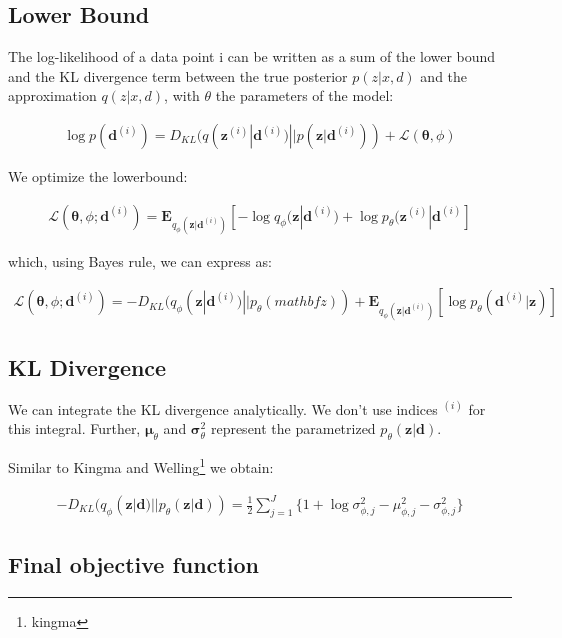 \documentclass{article}
\begin{document}
\subsection{Lower Bound}

The log-likelihood of a data point i can be written as a sum of the lower bound and the KL divergence term between the true posterior $p(z|x,d)$ and the approximation $q(z|x,d)$, with $\theta$ the parameters of the model:

\begin{align*}
	\log p(\mathbf{d}^{(i)}) = D_{KL}(q(\mathbf{z}^{(i)}|\mathbf{d}^{(i)}) || p(\mathbf{z}|\mathbf{d}^{(i)})) + \mathcal{L}(\mathbf{\theta}, \phi)
\end{align*}

We optimize the lowerbound: 

\begin{align}
\mathcal{L}(\mathbf{\theta}, \phi; \mathbf{d}^{(i)}) = 
\mathbf{E}_{q_\phi (\mathbf{z}|\mathbf{d}^{(i)})}[-\log q_\phi (\mathbf{z}| \mathbf{d}^{(i)})+\log p_\theta(\mathbf{z}^{(i)}|\mathbf{d}^{(i)} ]
\end{align}

which, using Bayes rule, we can express as:

\begin{align}
\mathcal{L}(\mathbf{\theta}, \phi; \mathbf{d}^{(i)}) = -D_{KL}(q_\phi (\mathbf{z}| \mathbf{d}^{(i)})||p_\theta (mathbf{z})) + \mathbf{E}_{q_\phi(\mathbf{z}|\mathbf{d}^{(i)})}[\log p_\theta (\mathbf{d}^{(i)}|\mathbf{z})]
\end{align}


\subsection{KL Divergence}

We can integrate the KL divergence analytically. We don't use indices $^{(i)}$ for this integral. Further, $\mathbf{\mu}_\theta$ and $\mathbf{\sigma}_\theta^2$ represent the parametrized $p_\theta(\mathbf{z}|\mathbf{d})$.

Similar to Kingma and Welling\footnote{kingma} we obtain:

\begin{align}
- D_{KL}(q_\phi (\mathbf{z}| \mathbf{d})||p_\theta (\mathbf{z}| \mathbf{d})) = \frac{1}{2}\sum\limits_{j=1}^{J}\{1+\log \sigma_{\phi ,j}^2 - \mu_{\phi,j}^2 - \sigma_{\phi ,j}^2\}
\end{align}

\subsection{Final objective function}
\end{document}
